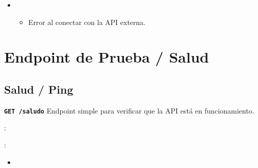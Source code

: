 \documentclass[a4paper,11pt,spanish]{sphinxmanual}
\newcommand{\robotoMonoBold}{\fontseries{b}\selectfont\ttfamily}
\renewcommand{\sphinxcode}[1]{\textcolor{sphinxorangeCode}{{\robotoMonoBold #1}}}
\renewcommand{\sphinxbfcode}[1]{\textbf{\sphinxcode{#1}}}
\renewcommand{\sphinxupquote}[1]{\texttt{#1}}
\begin{document}
\begin{fulllineitems}
\begin{itemize}
\begin{sphinxVerbatim}[commandchars=\\\{\}]
\end{sphinxVerbatim}

\item {} 
\sphinxAtStartPar
{}
\begin{itemize}
\item {} 
\sphinxAtStartPar
Error al conectar con la API externa.

\end{itemize}

\end{itemize}

\end{fulllineitems}



\section{Endpoint de Prueba / Salud}
\label{\detokenize{endpoints:endpoint-de-prueba-salud}}

\subsection{Salud / Ping}
\label{\detokenize{endpoints:salud-ping}}

\begin{fulllineitems}
\label{\detokenize{endpoints:get--saludo}}
\pysigstartsignatures
\pysigline
{\sphinxbfcode{\sphinxupquote{GET~}}\sphinxbfcode{\sphinxupquote{/saludo}}}
\pysigstopsignatures
\sphinxAtStartPar
Endpoint simple para verificar que la API está en funcionamiento.

\sphinxAtStartPar
{}:

\begin{sphinxVerbatim}[commandchars=\\\{\}]
  
 
\end{sphinxVerbatim}

\sphinxAtStartPar
{}:
\begin{itemize}
\item {} 
\sphinxAtStartPar
{}

\begin{sphinxVerbatim}[commandchars=\\\{\}]
\end{sphinxVerbatim}

\end{itemize}

\end{fulllineitems}
\end{document}
